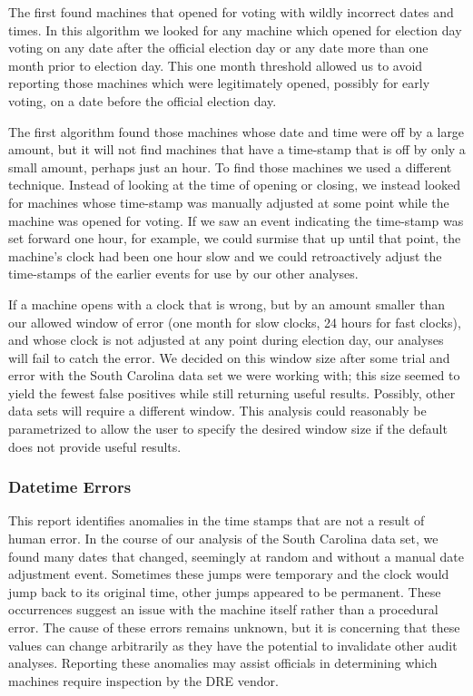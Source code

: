 The first found machines that opened for voting with wildly incorrect
dates and times. In this algorithm we looked for any machine which
opened for election day voting on any date after the official election
day or any date more than one month prior to election day. This one
month threshold allowed us to avoid reporting those machines which
were legitimately opened, possibly for early voting, on a date before
the official election day. 

The first algorithm found those machines whose date and time were
off by a large amount, but it will not find machines that have a
time-stamp that is off by only a small amount, perhaps just an
hour. To find those machines we used a different technique. Instead of
looking at the time of opening or closing, we instead looked for
machines whose time-stamp was manually adjusted at some point while
the machine was opened for voting. If we saw an event indicating the
time-stamp was set forward one hour, for example, we could surmise that
up until that point, the machine's clock had been one hour slow and we
could retroactively adjust the time-stamps of the earlier events for
use by our other analyses.

If a machine opens with a clock that is wrong, but by an amount
smaller than our allowed window of error (one month for slow clocks,
24 hours for fast clocks), and whose clock is not adjusted at any
point during election day, our analyses will fail to catch the
error. We decided on this window size after some trial and error with
the South Carolina data set we were working with; this size seemed to
yield the fewest false positives while still returning useful
results. Possibly, other data sets will require a different
window. This analysis could reasonably be parametrized to
allow the user to specify the desired window size if the default does
not provide useful results.

\subsubsection{Datetime Errors}
This report identifies anomalies in the time stamps that are not a result
of human error. In the course of our analysis of the South Carolina
data set, we found many dates that changed, seemingly at random and without
a manual date adjustment event. Sometimes these jumps were temporary
and the clock would jump back to its original time, other jumps
appeared to be permanent. These occurrences suggest an issue with the
machine itself rather than a procedural error. The cause of these errors remains
unknown, but it is concerning that these values can change arbitrarily
as they have the potential to invalidate other audit analyses.  Reporting these
anomalies may assist officials in determining which machines require
inspection by the DRE vendor.

